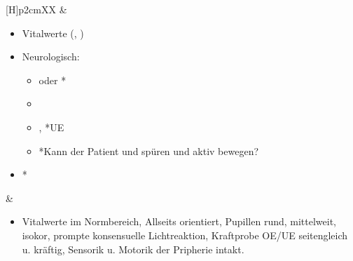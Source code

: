\begin{table}[H]
\begin{WidePar}
\begin{minipage}[t]{\linewidth -
{2\fboxrule} - {2\fboxsep}}
\begin{minipage}[t]{\linewidth}
{\begin{tabularx}{\linewidth}[H]{p{2cm}XX}
&
\begin{minipage}[t]{\linewidth}
\begin{itemize}
  \item Vitalwerte (, )
  \item Neurologisch:
  \begin{itemize}
    \item {} oder *
    \item {}
    \item {}, *UE
    \item *Kann der
    Patient  und  spüren und aktiv
    bewegen?
  \end{itemize}
  \item *
\end{itemize}
\end{minipage}
&
\noindent\color{MuwBlueDark}\begin{minipage}[t]{\linewidth}
\begin{itemize}
  \item[\SymbolPkuNormal] Vitalwerte im Normbereich,
  Allseits orientiert, Pupillen rund, mittelweit, isokor,
  prompte konsensuelle Lichtreaktion, Kraftprobe OE/UE
  seitengleich u. kräftig, Sensorik u. Motorik der Pripherie
  intakt.
\end{itemize}
\end{minipage}
\\\addlinespace\midrule\addlinespace
\noindent{}



\end{tabularx}}
\end{minipage}
\end{minipage}
\end{WidePar}
\end{table}
